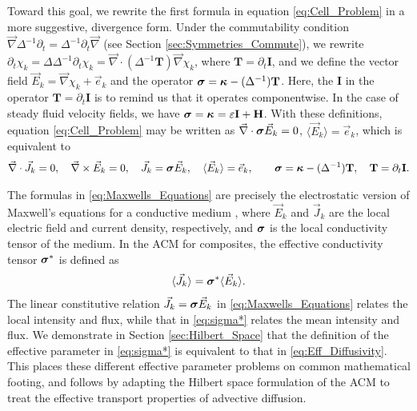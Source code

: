 \documentclass[11pt]{amsart}
\newcommand{\Tb}{\mathbf{T}}
\newcommand{\Hb}{\mathbf{H}}
\newcommand{\Ib}{\mathbf{I}}
\newcommand\bsig{\mbox{\boldmath${\sigma}$}}
\newcommand\bkappa{\mbox{\boldmath${\kappa}$}}
\begin{document}
Toward this goal, we rewrite the first formula in equation
\eqref{eq:Cell_Problem} in a more suggestive, divergence
form. Under the commutability condition
$\vec{\nabla}\Delta^{-1}\partial_t=\Delta^{-1}\partial_t\vec{\nabla}$ (see Section
\ref{sec:Symmetries_Commute}), we rewrite \cite{Fannjiang:SIAM_JAM:333}
$\partial_t\chi_k=\Delta\Delta^{-1}\partial_t\chi_k=\vec{\nabla}\cdot(\Delta^{-1}\Tb)\vec{\nabla}\chi_k$, where $\Tb=\partial_t\Ib$,
and we define the vector field $\vec{E}_k=\vec{\nabla}\chi_k+\vec{e}_k$ and the
operator $\bsig=\bkappa-(\Delta^{-1})\Tb$. Here, the $\Ib$ in the operator
$\Tb=\partial_t\Ib$ is to remind us that it operates componentwise. In the
case of steady fluid velocity fields, we have
$\bsig=\bkappa=\varepsilon\Ib+\Hb$. With these definitions, equation
\eqref{eq:Cell_Problem} may be written as $\vec{\nabla}\cdot\bsig\vec{E}_k=0$,
$\langle\vec{E}_k\rangle=\vec{e}_k$, which is equivalent to   
%
\begin{align}\label{eq:Maxwells_Equations}    
  \vec{\nabla}\cdot\vec{J}_k=0, \quad
  \vec{\nabla}\times\vec{E}_k=0, \quad
  \vec{J}_k=\bsig\vec{E}_k,\quad
  \langle\vec{E}_k\rangle=\vec{e}_k,\qquad
  \bsig=\bkappa-(\Delta^{-1})\Tb,
       \quad
       \Tb=\partial_t\Ib.
\end{align}
%




The formulas in \eqref{eq:Maxwells_Equations} are precisely the
electrostatic version of Maxwell's equations for a conductive medium
\cite{Golden:CMP-473}, where $\vec{E}_k$ and $\vec{J}_k$ are the local
electric field and current density, respectively, and $\bsig$ is the
local conductivity tensor of the medium. In the ACM for composites,
the effective conductivity tensor $\bsig^*$ is defined as
% 
\begin{align}\label{eq:sigma*}
  \langle\vec{J}_k\rangle=\bsig^*\langle\vec{E}_k\rangle.
\end{align}
%
The linear constitutive relation $\vec{J}_k=\bsig\vec{E}_k$ in
\eqref{eq:Maxwells_Equations} relates the local intensity and flux,
while that in \eqref{eq:sigma*} relates the mean intensity and flux. We
demonstrate in Section \ref{sec:Hilbert_Space} that the definition of
the effective parameter in \eqref{eq:sigma*} is equivalent to that in
\eqref{eq:Eff_Diffusivity}. This places these different effective
parameter problems on common mathematical footing, and follows by
adapting the Hilbert space formulation of the ACM to treat the
effective transport properties of advective diffusion.        
\end{document}
